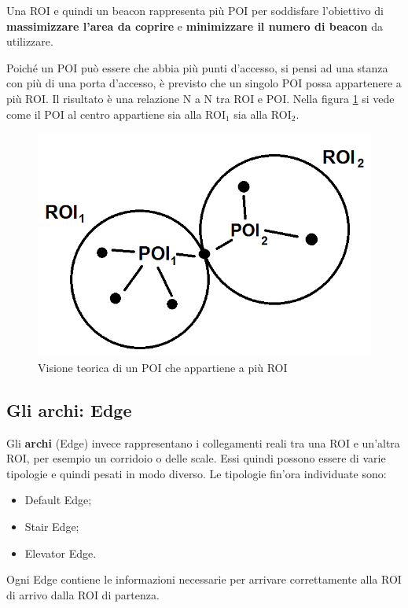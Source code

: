 \documentclass[../ManualeSviluppatore.tex]{subfiles}
\begin{document}
	Una ROI e quindi un beacon rappresenta più POI per soddisfare l'obiettivo di \textbf{massimizzare l'area da coprire} e \textbf{minimizzare il numero di beacon} da utilizzare.
	
	Poiché un POI può essere che abbia più punti d'accesso, si pensi ad una stanza con più di una porta d'accesso, è previsto che un singolo POI possa appartenere a più ROI. Il risultato è una relazione N a N tra ROI e POI. Nella figura \ref{fig:ROIePOI-NtoN} si vede come il POI al centro appartiene sia alla ROI$_1$ sia alla ROI$_2$.
	
	\begin{figure} [h]
		\centering
		\includegraphics[scale=0.4]{img/POIeROI-NtoN}
		\caption{Visione teorica di un POI che appartiene a più ROI}
		\label{fig:ROIePOI-NtoN}
	\end{figure}
	
	
	\subsection{Gli archi: Edge}
	
	Gli \textbf{archi} (Edge) invece rappresentano i collegamenti reali tra una ROI e un'altra ROI, per esempio un corridoio o delle scale.
	Essi quindi possono essere di varie tipologie e quindi pesati in modo diverso. Le tipologie fin'ora individuate sono:
	\begin{itemize}
		\item Default Edge;
		\item Stair Edge;
		\item Elevator Edge.
	\end{itemize}
	Ogni Edge contiene le informazioni necessarie per arrivare correttamente alla ROI di arrivo dalla ROI di partenza.	
	
\end{document}
